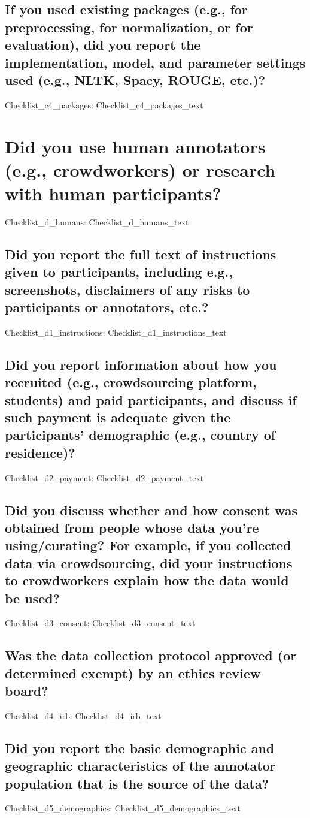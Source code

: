 \documentclass[11pt]{article}
\begin{document}
\subsection{If you used existing packages (e.g., for preprocessing, for normalization, or for evaluation), did you report the implementation, model, and parameter settings used (e.g., NLTK, Spacy, ROUGE, etc.)?}
{{Checklist_c4_packages}}: {{Checklist_c4_packages_text}}

\section{Did you use human annotators (e.g., crowdworkers) or research with human participants?}
{{Checklist_d_humans}}: {{Checklist_d_humans_text}}
\subsection{Did you report the full text of instructions given to participants, including e.g., screenshots, disclaimers of any risks to participants or annotators, etc.?}
{{Checklist_d1_instructions}}: {{Checklist_d1_instructions_text}}
\subsection{Did you report information about how you recruited (e.g., crowdsourcing platform, students) and paid participants, and discuss if such payment is adequate given the participants’ demographic (e.g., country of residence)?}
{{Checklist_d2_payment}}: {{Checklist_d2_payment_text}}
\subsection{Did you discuss whether and how consent was obtained from people whose data you’re using/curating? For example, if you collected data via crowdsourcing, did your instructions to crowdworkers explain how the data would be used?}
{{Checklist_d3_consent}}: {{Checklist_d3_consent_text}}
\subsection{Was the data collection protocol approved (or determined exempt) by an ethics review board?}
{{Checklist_d4_irb}}: {{Checklist_d4_irb_text}}
\subsection{Did you report the basic demographic and geographic characteristics of the annotator population that is the source of the data?}
{{Checklist_d5_demographics}}: {{Checklist_d5_demographics_text}}
\end{document}
